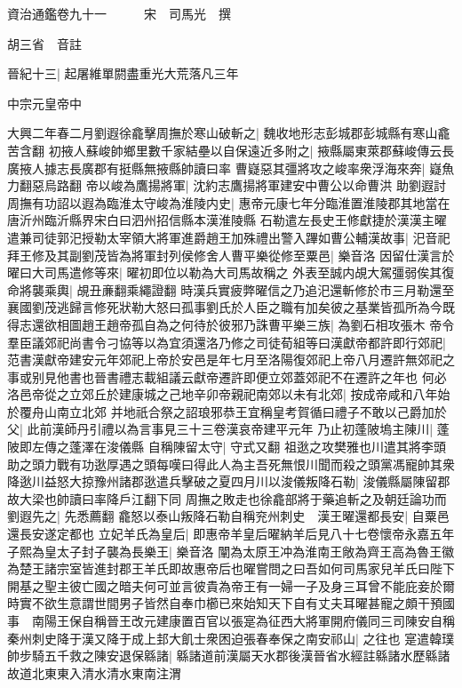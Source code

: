 資治通鑑卷九十一　　　宋　司馬光　撰

胡三省　音註

晉紀十三|{
	起屠維單閼盡重光大荒落凡三年}


中宗元皇帝中

大興二年春二月劉遐徐龕擊周撫於寒山破斬之|{
	魏收地形志彭城郡彭城縣有寒山龕苦含翻}
初掖人蘇峻帥鄉里數千家結壘以自保遠近多附之|{
	掖縣屬東萊郡蘇峻傳云長廣掖人據志長廣郡有挺縣無掖縣帥讀曰率}
曹嶷惡其彊將攻之峻率衆浮海來奔|{
	嶷魚力翻惡烏路翻}
帝以峻為鷹揚將軍|{
	沈約志鷹揚將軍建安中曹公以命曹洪}
助劉遐討周撫有功詔以遐為臨淮太守峻為淮陵内史|{
	惠帝元康七年分臨淮置淮陵郡其地當在唐沂州臨沂縣界宋白曰泗州招信縣本漢淮陵縣}
石勒遣左長史王修獻捷於漢漢主曜遣兼司徒郭汜授勒太宰領大將軍進爵趙王加殊禮出警入蹕如曹公輔漢故事|{
	汜音祀}
拜王修及其副劉茂皆為將軍封列侯修舍人曹平樂從修至粟邑|{
	樂音洛}
因留仕漢言於曜曰大司馬遣修等來|{
	曜初即位以勒為大司馬故稱之}
外表至誠内覘大駕彊弱俟其復命將襲乘輿|{
	覘丑亷翻乘繩證翻}
時漢兵實疲弊曜信之乃追汜還斬修於市三月勒還至襄國劉茂逃歸言修死狀勒大怒曰孤事劉氏於人臣之職有加矣彼之基業皆孤所為今既得志還欲相圖趙王趙帝孤自為之何待於彼邪乃誅曹平樂三族|{
	為劉石相攻張木}
帝令羣臣議郊祀尚書令刁協等以為宜須還洛乃修之司徒荀組等曰漢獻帝都許即行郊祀|{
	范書漢獻帝建安元年郊祀上帝於安邑是年七月至洛陽復郊祀上帝八月遷許無郊祀之事或别見他書也晉書禮志載組議云獻帝遷許即便立郊蓋郊祀不在遷許之年也}
何必洛邑帝從之立郊丘於建康城之己地辛卯帝親祀南郊以未有北郊|{
	按成帝咸和八年始於覆舟山南立北郊}
并地祇合祭之詔琅邪恭王宜稱皇考賀循曰禮子不敢以己爵加於父|{
	此前漢師丹引禮以為言事見三十三卷漢哀帝建平元年}
乃止初蓬陂塢主陳川|{
	蓬陂即左傳之蓬澤在浚儀縣}
自稱陳留太守|{
	守式又翻}
祖逖之攻樊雅也川遣其將李頭助之頭力戰有功逖厚遇之頭每嘆曰得此人為主吾死無恨川聞而殺之頭黨馮寵帥其衆降逖川益怒大掠豫州諸郡逖遣兵擊破之夏四月川以浚儀叛降石勒|{
	浚儀縣屬陳留郡故大梁也帥讀曰率降戶江翻下同}
周撫之敗走也徐龕部將于藥追斬之及朝廷論功而劉遐先之|{
	先悉薦翻}
龕怒以泰山叛降石勒自稱兖州刺史　漢王曜還都長安|{
	自粟邑還長安遂定都也}
立妃羊氏為皇后|{
	即惠帝羊皇后曜納羊后見八十七卷懷帝永嘉五年}
子熙為皇太子封子襲為長樂王|{
	樂音洛}
闡為太原王冲為淮南王敞為齊王高為魯王徽為楚王諸宗室皆進封郡王羊氏即故惠帝后也曜嘗問之曰吾如何司馬家兒羊氏曰陛下開基之聖主彼亡國之暗夫何可並言彼貴為帝王有一婦一子及身三耳曾不能庇妾於爾時實不欲生意謂世間男子皆然自奉巾櫛已來始知天下自有丈夫耳曜甚寵之頗干預國事　南陽王保自稱晉王改元建康置百官以張寔為征西大將軍開府儀同三司陳安自稱秦州刺史降于漢又降于成上邽大飢士衆困迫張春奉保之南安祁山|{
	之往也}
寔遣韓璞帥步騎五千救之陳安退保緜諸|{
	緜諸道前漢屬天水郡後漢晉省水經註緜諸水歷緜諸故道北東東入清水清水東南注渭}
